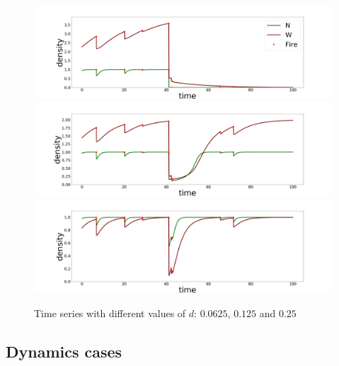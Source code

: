 \documentclass{article}
\begin{document}
\begin{figure}[h!]
\begin{center}
\includegraphics[height = 3.5cm]{results/time_series_2.png}
\includegraphics[height = 3.5cm]{results/time_series_3.png}
\includegraphics[height = 3.5cm]{results/time_series_4.png}
\end{center}
\caption{\label{fig:dynexample}Time series with different values of $d$: $0.0625$, $0.125$ and $0.25$}
\end{figure}

\newpage

\subsection{Dynamics cases}
\label{dyna_cases}

\end{document}
